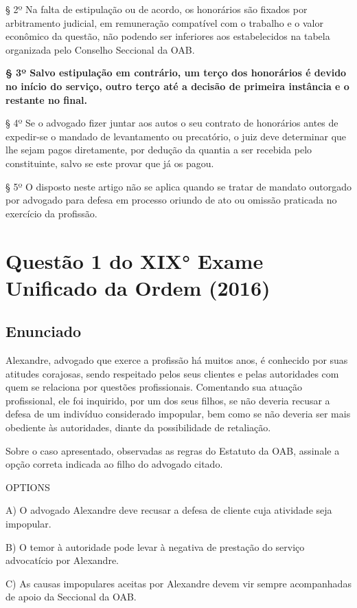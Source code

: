 \documentclass[12pt]{article}
\begin{document}
§ 2º Na falta de estipulação ou de acordo, os honorários são fixados por arbitramento judicial, em remuneração compatível com o trabalho e o valor econômico da questão, não podendo ser inferiores aos estabelecidos na tabela organizada pelo Conselho Seccional da OAB.

\textbf{§ 3º Salvo estipulação em contrário, um terço dos honorários é devido no início do serviço, outro terço até a decisão de primeira instância e o restante no final.}

§ 4º Se o advogado fizer juntar aos autos o seu contrato de honorários antes de expedir-se o mandado de levantamento ou precatório, o juiz deve determinar que lhe sejam pagos diretamente, por dedução da quantia a ser recebida pelo constituinte, salvo se este provar que já os pagou.

§ 5º O disposto neste artigo não se aplica quando se tratar de mandato outorgado por advogado para defesa em processo oriundo de ato ou omissão praticada no exercício da profissão.

\section{Questão 1 do XIX° Exame Unificado da Ordem (2016)}

\subsection{Enunciado}

Alexandre, advogado que exerce a profissão há muitos anos, é 
conhecido por suas atitudes corajosas, sendo respeitado pelos 
seus clientes e pelas autoridades com quem se relaciona por 
questões profissionais. Comentando sua atuação profissional, 
ele foi inquirido, por um dos seus filhos, se não deveria 
recusar a defesa de um indivíduo considerado impopular, bem 
como se não deveria ser mais obediente às autoridades, 
diante da possibilidade de retaliação. 
 
Sobre o caso apresentado, observadas as regras do Estatuto 
da OAB, assinale a opção correta indicada ao filho do 
advogado citado. 
 
OPTIONS

A) O advogado Alexandre deve recusar a defesa de cliente 
cuja atividade seja impopular. 

B) O temor à autoridade pode levar à negativa de prestação 
do serviço advocatício por Alexandre. 

C) As causas impopulares aceitas por Alexandre devem vir 
sempre acompanhadas de apoio da Seccional da OAB. 
\end{document}
